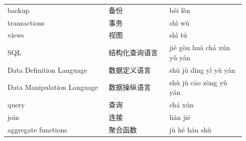 \documentclass[11pt]{article}
\begin{document}
\begin{longtable}{@{}p{0.40\linewidth}p{0.24\linewidth}p{0.30\linewidth}@{}}
backup & 备份 & bèi fèn \\
transactions & 事务 & shì wù \\
views & 视图 & shì tú \\
SQL & 结构化查询语言 & jié gòu huà chá xún yǔ yán \\
Data Definition Language & 数据定义语言 & shù jù dìng yì yǔ yán \\
Data Manipulation Language & 数据操纵语言 & shù jù cāo zòng yǔ yán \\
query & 查询 & chá xún \\
join & 连接 & lián jiē \\
aggregate functions & 聚合函数 & jù hé hán shù \\
\end{longtable}
\end{document}
